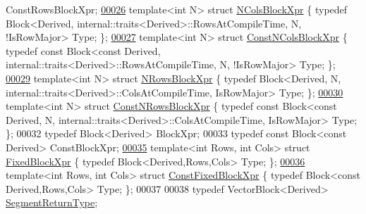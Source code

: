 \begin{DoxyCode}
      ConstRowsBlockXpr;
\hyperlink{struct_n_cols_block_xpr}{00026} \textcolor{keyword}{template}<\textcolor{keywordtype}{int} N> \textcolor{keyword}{struct }\hyperlink{struct_n_cols_block_xpr}{NColsBlockXpr} \{ \textcolor{keyword}{typedef} Block<Derived,
       internal::traits<Derived>::RowsAtCompileTime, N, !IsRowMajor> Type; \};
\hyperlink{struct_const_n_cols_block_xpr}{00027} \textcolor{keyword}{template}<\textcolor{keywordtype}{int} N> \textcolor{keyword}{struct }\hyperlink{struct_const_n_cols_block_xpr}{ConstNColsBlockXpr} \{ \textcolor{keyword}{typedef} \textcolor{keyword}{const} Block<const Derived,
       internal::traits<Derived>::RowsAtCompileTime, N, !IsRowMajor> Type; \};
\hyperlink{struct_n_rows_block_xpr}{00029} \textcolor{keyword}{template}<\textcolor{keywordtype}{int} N> \textcolor{keyword}{struct }\hyperlink{struct_n_rows_block_xpr}{NRowsBlockXpr} \{ \textcolor{keyword}{typedef} Block<Derived, N,
       internal::traits<Derived>::ColsAtCompileTime, IsRowMajor> Type; \};
\hyperlink{struct_const_n_rows_block_xpr}{00030} \textcolor{keyword}{template}<\textcolor{keywordtype}{int} N> \textcolor{keyword}{struct }\hyperlink{struct_const_n_rows_block_xpr}{ConstNRowsBlockXpr} \{ \textcolor{keyword}{typedef} \textcolor{keyword}{const} Block<const Derived, N,
       internal::traits<Derived>::ColsAtCompileTime, IsRowMajor> Type; \};
00032 \textcolor{keyword}{typedef} Block<Derived> BlockXpr;
00033 \textcolor{keyword}{typedef} \textcolor{keyword}{const} Block<const Derived> ConstBlockXpr;
\hyperlink{struct_fixed_block_xpr}{00035} \textcolor{keyword}{template}<\textcolor{keywordtype}{int} Rows, \textcolor{keywordtype}{int} Cols> \textcolor{keyword}{struct }\hyperlink{struct_fixed_block_xpr}{FixedBlockXpr} \{ \textcolor{keyword}{typedef} Block<Derived,Rows,Cols> Type; \};
\hyperlink{struct_const_fixed_block_xpr}{00036} \textcolor{keyword}{template}<\textcolor{keywordtype}{int} Rows, \textcolor{keywordtype}{int} Cols> \textcolor{keyword}{struct }\hyperlink{struct_const_fixed_block_xpr}{ConstFixedBlockXpr} \{ \textcolor{keyword}{typedef} Block<const
       Derived,Rows,Cols> Type; \};
00037 
00038 \textcolor{keyword}{typedef} VectorBlock<Derived> \hyperlink{group___core___module_class_eigen_1_1_vector_block}{SegmentReturnType};

\end{DoxyCode}
